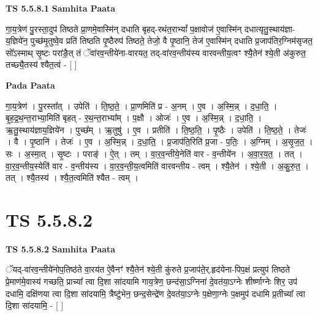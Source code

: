\documentclass[17pt]{extarticle}
\begin{document}
\textbf{TS 5.5.8.1 } \newline
\textbf{Samhita Paata} \newline

गा॒य॒त्रेण॑ पु॒रस्ता॒दुप॑ तिष्ठते प्रा॒णमे॒वास्मि॑न् दधाति बृहद्-रथंत॒राभ्यां᳚ प॒क्षावोज॑ ए॒वास्मि॑न् दधात्यृतु॒स्थाय॑ज्ञा-य॒ज्ञिये॑न॒ पुच्छ॑मृ॒तुष्वे॒व प्रति॑ तिष्ठति पृ॒ष्ठैरुप॑ तिष्ठते॒ तेजो॒ वै पृ॒ष्ठानि॒ तेज॑ ए॒वास्मि॑न् दधाति प्र॒जाप॑तिर॒ग्निम॑सृजत॒ सो᳚ऽस्माथ् सृ॒ष्टः परा॑ङै॒त् तं ॅवा॑रव॒न्तीये॑ना-वारयत॒ तद्-वा॑रव॒न्तीय॑स्य वारवन्तीय॒त्वꣳ श्यै॒तेन॑ श्ये॒ती अ॑कुरुत॒ तच्छ्यै॒तस्य॑ श्यैत॒त्वं - [  ] \newline

\textbf{Pada Paata} \newline

गा॒य॒त्रेण॑ । पु॒रस्ता᳚त् । उपेति॑ । ति॒ष्ठ॒ते॒ । प्रा॒णमिति॑ प्र - अ॒नम् । ए॒व । अ॒स्मि॒न्न् । द॒धा॒ति॒ । बृ॒ह॒द्र॒थ॒न्त॒राभ्या॒मिति॑ बृहत् - र॒थ॒न्त॒राभ्या᳚म् । प॒क्षौ । ओजः॑ । ए॒व । अ॒स्मि॒न्न् । द॒धा॒ति॒ । ऋ॒तु॒स्थाय॑ज्ञाय॒ज्ञिये॑न । पुच्छ᳚म् । ऋ॒तुषु॑ । ए॒व । प्रतीति॑ । ति॒ष्ठ॒ति॒ । पृ॒ष्ठैः । उपेति॑ । ति॒ष्ठ॒ते॒ । तेजः॑ । वै । पृ॒ष्ठानि॑ । तेजः॑ । ए॒व । अ॒स्मि॒न्न् । द॒धा॒ति॒ । प्र॒जाप॑ति॒रिति॑ प्र॒जा - प॒तिः॒ । अ॒ग्निम् । अ॒सृ॒ज॒त॒ । सः । अ॒स्मा॒त् । सृ॒ष्टः । पराङ्॑ । ऐ॒त् । तम् । वा॒र॒व॒न्तीये॒नेति॑ वार - व॒न्तीये॑न । अ॒वा॒र॒य॒त॒ । तत् । वा॒र॒व॒न्तीय॒स्येति॑ वार - व॒न्तीय॑स्य । वा॒र॒व॒न्ती॒य॒त्वमिति॑ वारवन्तीय - त्वम् । श्यै॒तेन॑ । श्ये॒ती । अ॒कु॒रु॒त॒ । तत् । श्यै॒तस्य॑ । श्यै॒त॒त्वमिति॑ श्यैत - त्वम् ।  \newline




\section*{ TS 5.5.8.2 }

\textbf{TS 5.5.8.2 } \newline
\textbf{Samhita Paata} \newline

ॅयद्-वा॑रव॒न्तीये॑नोप॒तिष्ठ॑ते वा॒रय॑त ऐ॒वैनꣳ॑ श्यै॒तेन॑ श्ये॒ती कु॑रुते प्र॒जाप॑ते॒र्.हृद॑येना-पिप॒क्षं प्रत्युप॑ तिष्ठते प्रे॒माण॑मे॒वास्य॑ गच्छति॒ प्राच्या᳚ त्वा दि॒शा सा॑दयामि गाय॒त्रेण॒ छन्द॑सा॒ऽग्निना॑ दे॒वत॑या॒ऽग्नेः शीर्ष्णाग्नेः शिर॒ उप॑ दधामि॒ दक्षि॑णया त्वा दि॒शा सा॑दयामि॒ त्रैष्टु॑भेन॒ छन्द॒सेन्द्रे॑ण दे॒वत॑या॒ऽग्नेः प॒क्षेणा॒ग्नेः प॒क्षमुप॑ दधामि प्र॒तीच्या᳚ त्वा दि॒शा सा॑दयामि॒ - [  ] \newline
\end{document}
